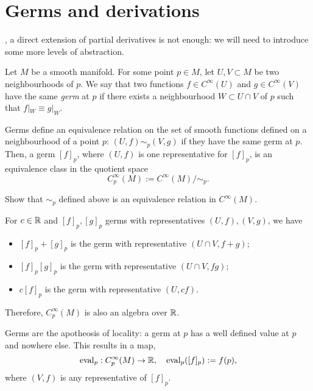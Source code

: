 \section{Germs and derivations}

, a direct extension of partial derivatives is not enough: we will need to introduce some more levels of abstraction.

\begin{definition}
  Let $M$ be a smooth manifold.
  For some point $p\in M$, let $U,V\subset M$ be two neighbourhoods of $p$.
  We say that two functions $f\in C^\infty(U)$ and $g\in C^\infty(V)$ have the same \emph{germ} at $p$ if there exists a neighbourhood $W\subset U\cap V$ of $p$ such that $f|_W \equiv g|_W$.
\end{definition}

Germs define an equivalence relation on the set of smooth functions defined on a neighbourhood of a point $p$: $(U, f) \sim_p (V, g)$ if they have the same germ at $p$. Then, a germ $[f]_p$, where $(U, f)$ is one representative for $[f]_p$, is an equivalence class in the quotient space 
\begin{equation}
  C_p^\infty(M) := C^\infty(M)/\sim_p.
\end{equation} 

\begin{exercise}
  Show that $\sim_p$ defined above is an equivalence relation in $C^\infty(M)$.
\end{exercise}

For $c\in\mathbb{R}$ and $[f]_p, [g]_p$ germs with representatives $(U, f), (V, g)$, we have
\begin{itemize}
  \item $[f]_p + [g]_p$ is the germ with representative $(U\cap V, f+g)$;
  \item $[f]_p [g]_p$ is the germ with representative $(U\cap V, f g)$;
  \item $c[f]_p$ is the germ with representative $(U, cf)$.
\end{itemize}
Therefore, $C_p^\infty(M)$ is also an algebra over $\mathbb{R}$.

Germs are the apotheosis of locality: a germ at $p$ has a well defined value at $p$ and nowhere else.
This results in a map,
\begin{equation}
  \operatorname{eval}_p: C_p^\infty(M) \to \mathbb{R}, \quad
  \operatorname{eval}_p([f]_p) := f(p),
\end{equation}
where $(V,f)$ is any representative of $[f]_p$.

